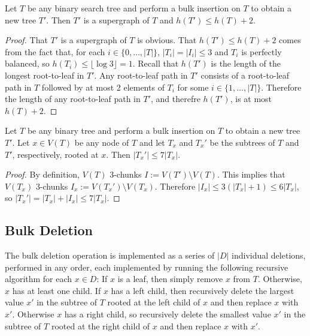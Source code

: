 \documentclass[kpfonts]{patmorin}
\let\le\leqslant
\begin{document}
\begin{lem}
  Let $T$ be any binary search tree and perform a bulk insertion on $T$ to obtain a new tree $T'$.  Then $T'$ is a supergraph of $T$ and $h(T')\le h(T)+2$.
\end{lem}

\begin{proof}
  That $T'$ is a supergraph of $T$ is obvious.  That $h(T')\le h(T)+2$ comes from the fact that, for each $i\in\{0,\ldots,|T|\}$, $|T_i|=|I_i|\le 3$ and $T_i$ is perfectly balanced, so $h(T_i)\le\lfloor\log 3\rfloor = 1$. Recall that $h(T')$ is the length of the longest root-to-leaf in $T'$. Any root-to-leaf path in $T'$ consists of a root-to-leaf path in $T$ followed by at most 2 elements of $T_i$ for some $i\in\{1,\ldots,|T|\}$.  Therefore the length of any root-to-leaf path in $T'$, and therefre $h(T')$, is at most $h(T)+2$.
\end{proof}

\begin{lem}
  Let $T$ be any binary tree and perform a bulk insertion on $T$ to obtain a new tree $T'$.  Let $x\in V(T)$ be any node of $T$ and let $T_x$ and $T_x'$ be the subtrees of $T$ and $T'$, respectively, rooted at $x$.  Then $|T_x'|\le 7|T_x|$.
\end{lem}

\begin{proof}
  By definition, $V(T)$ 3-chunks $I:=V(T')\setminus V(T)$.  This implies that $V(T_x)$ 3-chunks $I_x:=V(T_x')\setminus V(T_x)$.  Therefore $|I_x|\le 3(|T_x|+1)\le 6|T_x|$, so $|T_x'|=|T_x|+|I_x|\le 7|T_x|$.
\end{proof}


\subsection{Bulk Deletion}

The bulk deletion operation is implemented as a series of $|D|$ individual deletions, performed in any order, each implemented by running the following recursive algorithm for each $x\in D$:  If $x$ is a leaf, then simply remove $x$ from $T$.  Otherwise, $x$ has at least one child.  If $x$ has a left child, then recursively delete the largest value $x'$ in the subtree of $T$ rooted at the left child of $x$ and then replace $x$ with $x'$.  Otherwise $x$ has a right child, so recursively delete the smallest value $x'$ in the subtree of $T$ rooted at the right child of $x$ and then replace $x$ with $x'$.
\end{document}
